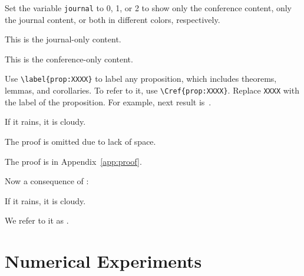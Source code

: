 \documentclass{article}
\begin{document}
\begin{bullets}
    \blt[overview]
    \blt[journal]  Set the variable \texttt{journal} to 0, 1, or 2 to show only the conference content, only the journal content, or both in different colors, respectively.
    \begin{journalonly}
        This is the journal-only content.
    \end{journalonly}
    \begin{conferenceonly}
        This is the conference-only content.
    \end{conferenceonly}

    \blt[References]Use \texttt{\textbackslash label\{prop:XXXX\}} to label any proposition, which includes theorems, lemmas, and corollaries. To refer to it, use \texttt{\textbackslash Cref\{prop:XXXX\}}. Replace \texttt{XXXX} with the label of the proposition.  For example, next result is~.


    \begin{theorem}
        \label{prop:mainresult}
        If it rains, it is cloudy.
    \end{theorem}
    \begin{IEEEproof}
        \begin{conferenceonly}
            The proof is omitted due to lack of space.
        \end{conferenceonly}
        \begin{journalonly}
            The proof is in Appendix~\ref{app:proof}.
        \end{journalonly}
    \end{IEEEproof}

    \blt[corollary] Now a consequence of :

    \begin{corollary}
        \label{prop:corollary}
        If it rains, it is cloudy.
    \end{corollary}

    We refer to it as .



\end{bullets}


\section{Numerical Experiments}

\begin{bullets}
\end{bullets}
\end{document}

